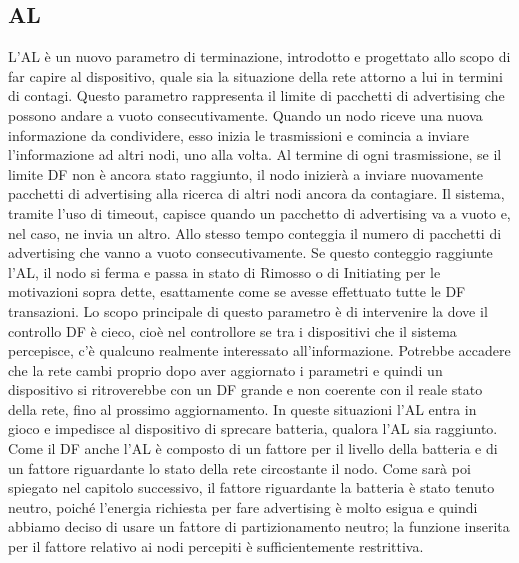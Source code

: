 \subsection{\acf{AL}}
L'\acf{AL} è un nuovo parametro di terminazione, introdotto e progettato allo scopo di far capire al dispositivo, quale sia la situazione della rete attorno a lui in termini di contagi. Questo parametro rappresenta il limite di pacchetti di advertising che possono andare a vuoto consecutivamente. Quando un nodo riceve una nuova informazione da condividere, esso inizia le trasmissioni e comincia a inviare l'informazione ad altri nodi, uno alla volta. Al termine di ogni trasmissione, se il limite DF non è ancora stato raggiunto, il nodo inizierà a inviare nuovamente pacchetti di advertising alla ricerca di altri nodi ancora da contagiare. Il sistema, tramite l'uso di timeout, capisce quando un pacchetto di advertising va a vuoto e, nel caso, ne invia un altro. Allo stesso tempo conteggia il numero di pacchetti di advertising che vanno a vuoto consecutivamente. Se questo conteggio raggiunte l'AL, il nodo si ferma e passa in stato di Rimosso o di Initiating per le motivazioni sopra dette, esattamente come se avesse effettuato tutte le DF transazioni. Lo scopo principale di questo parametro è di intervenire la dove il controllo DF è cieco, cioè nel controllore se tra i dispositivi che il sistema percepisce, c'è qualcuno realmente interessato all'informazione. Potrebbe accadere che la rete cambi proprio dopo aver aggiornato i parametri e quindi un dispositivo si ritroverebbe con un DF grande e non coerente con il reale stato della rete, fino al prossimo aggiornamento. In queste situazioni l'AL entra in gioco e impedisce al dispositivo di sprecare batteria, qualora l'AL sia raggiunto.
Come il DF anche l'AL è composto di un fattore per il livello della batteria e di un fattore riguardante lo stato della rete circostante il nodo. Come sarà poi spiegato nel capitolo successivo, il fattore riguardante la batteria è stato tenuto neutro, poiché l'energia richiesta per fare advertising è molto esigua e quindi abbiamo deciso di usare un fattore di partizionamento neutro; la funzione inserita per il fattore relativo ai nodi percepiti è sufficientemente restrittiva.

